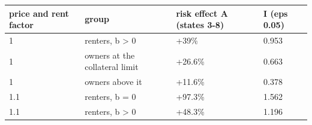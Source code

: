 \begingroup\small
\setlength{\tabcolsep}{3pt}
\renewcommand{\arraystretch}{1.04}
\begin{tabularx}{\linewidth}{XXXX}
\toprule
price and rent factor & group & risk effect A (states 3-8) & I (eps 0.05) \\
\midrule
1 & renters, b \textgreater{} 0 & +39\% & 0.953 \\
1 & owners at the collateral limit & +26.6\% & 0.663 \\
1 & owners above it & +11.6\% & 0.378 \\
1.1 & renters, b = 0 & +97.3\% & 1.562 \\
1.1 & renters, b \textgreater{} 0 & +48.3\% & 1.196 \\
\bottomrule
\end{tabularx}
\endgroup
